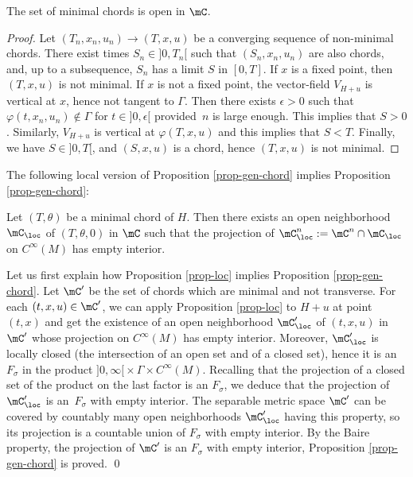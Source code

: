 \begin{lem}\label{lem-open}
The set of minimal chords is open in $\mC$.
\end{lem}

\begin{proof}
Let $(T_n,x_n,u_n)\to (T,x,u)$ be a converging sequence of non-minimal chords. There exist times
$S_n\in{}]0, T_n [$ such that $(S_n,x_n,u_n)$ are also chords, and, up to a subsequence,
$S_n$ has a limit $S$ in $[0,T]$.
If $x$ is a fixed point, then $(T,x,u)$ is not minimal.
If $x$ is not a fixed point,
the vector-field
$V_{H+u}$ is vertical at $x$, hence not tangent to $\Gamma$. Then there exists $\epsilon>0$ such that $\varphi(t, x_n,u_n)\not \in \Gamma$
for $t\in{}]0, \epsilon[$ provided~$n$ is large enough. This implies that $S>0$.
Similarly, $V_{H+u}$ is vertical at $\varphi(T,x,u)$ and this implies that $S<T$.
Finally, we have $S\in{}]0,T[$, and $(S,x,u)$ is a chord, hence $(T,x,u)$ is not minimal.
\end{proof}

The following local version of Proposition \ref{prop-gen-chord} implies Proposition \ref{prop-gen-chord}:

\begin{prop}\label{prop-loc}
Let $(T,\theta)$ be a minimal chord of $H$. Then there exists an open neighborhood $\mC_{\loc}$ of $(T,\theta,0)$ in
$\mC$ such that the projection of $\mC^n_{\loc}:=\mC^n\cap\mC_{\loc}$ on $C^{\infty}(M)$ has empty interior.
\end{prop}

Let us first explain how Proposition \ref{prop-loc} implies Proposition \ref{prop-gen-chord}.
Let $\mC'$ be the set of chords which are minimal and not transverse.
For each $(t,x,u)\in \mC'$, we can apply Proposition \ref{prop-loc} to $H+u$ at point $(t,x)$
and get the existence of an open neighborhood
$\mC'_{\loc}$ of $(t, x, u)$ in $\mC'$ whose projection on $C^{\infty}(M)$ has empty interior.
Moreover, $\mC'_{\loc}$ is locally closed (the intersection of an open set and of a closed set), hence it is an~$F_{\sigma}$ in
the product $]0,\infty[{}\times \Gamma\times C^{\infty}(M)$.
Recalling that the projection of a closed set of the product on the last factor is an $F_{\sigma}$, we deduce that the projection of $\mC'_{\loc}$ is an~$F_{\sigma}$ with empty interior.
The separable metric space $\mC'$ can be covered by countably many open neighborhoods $\mC'_{\loc}$ having this property, so its projection is a countable union of $F_{\sigma}$ with empty interior. By the Baire property, the projection of $\mC'$ is an
$F_{\sigma}$ with empty interior, Proposition \ref{prop-gen-chord} is proved.
\qed

